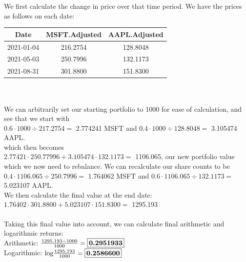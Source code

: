 \documentclass{article}
\begin{document}
{\Large



We first calculate the change in price over that time period. We have the prices as follows on each date: \\

\begin{tabular}{|c|c|c|}
	\hline
	\textbf{Date} & \textbf{MSFT.Adjusted} & \textbf{AAPL.Adjusted} \\
	\hline
	2021-01-04 & 216.2754 & 128.8048 \\
	\hline
	2021-05-03 & 250.7996 & 132.1173 \\
	\hline
	2021-08-31 & 301.8800 & 151.8300 \\
	\hline
\end{tabular} \\ \\
We can arbitrarily set our starting portfolio to 1000 for ease of calculation, and see that we start with \\ 
$ 0.6 \cdot 1000 \div 217.2754 = $ 2.774241 MSFT and $ 0.4 \cdot 1000 \div 128.8048 = $ 3.105474 AAPL. \\
which then becomes \\
$ 2.77421 \cdot 250.77996 + 3.105474 \cdot 132.1173 = $ 1106.065,
our new portfolio value which we now need to rebalance. We can recalculate our share counts to be \\
$ 0.4 \cdot 1106.065 \div 250.7996 = $ 1.764062 MSFT and $0.6 \cdot 1106.065 \div 132.1173 = $ 5.023107 AAPL. \\
We then calculate the final value at the end date: \\
$1.76402 \cdot 301.8800 + 5.023107 \cdot 151.8300 = $ 1295.193 \\ \\
Taking this final value into account, we can calculate final arithmetic and logarithmic returns: \\
Arithmetic: $\frac{1295.193 - 1000}{1000} = \framebox[1.1\width]{\textbf{0.2951933}}
$ \\
Logarithmic: $\text{log}\frac{1295.193}{1000} = \framebox[1.1\width]{\textbf{0.2586600}}$

}
\end{document}
